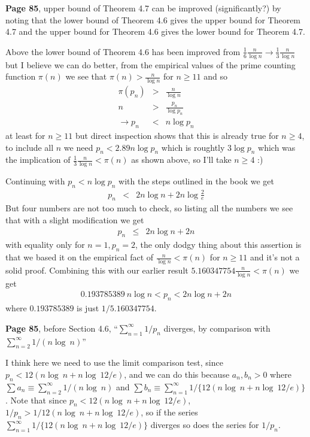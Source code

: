 \documentclass[aps,preprint,preprintnumbers,nofootinbib,showpacs,prd]{revtex4-1}
\newcommand{\nbea}{\begin{eqnarray*}}
\newcommand{\neea}{\end{eqnarray*}}
\begin{document}
{\bf Page 85}, upper bound of Theorem 4.7 can be improved (significantly?) by noting that the lower bound of Theorem 4.6 gives the upper bound for Theorem 4.7 and the upper bound for Theorem 4.6 gives the lower bound for Theorem 4.7.

Above the lower bound of Theorem 4.6 has been improved from $\frac{1}{6}\frac{n}{\log n} \to \frac{1}{3}\frac{n}{\log n}$ but I believe we can do better, from the empirical values of the prime counting function $\pi(n)$ we see that $\pi(n) > \frac{n}{\log n}$ for $n \ge 11$ and so
%
\nbea
\pi(p_n) & > & \frac{n}{\log n} \\
n & > & \frac{p_n}{\log p_n} \\
\to p_n & < & n \log p_n
\neea
%
at least for $n \ge 11$ but direct inspection shows that this is already true for $n \ge 4$, to include all $n$ we need $p_n < 2.89 n\log p_n$ which is roughtly $3\log p_n$ which was the implication of $\frac{1}{3}\frac{n}{\log n} < \pi(n)$ as shown above, so I'll take $n \ge 4$ :) 

Continuing with $p_n < n\log p_n$ with the steps outlined in the book we get
%
\nbea
p_n & < & 2n\log n + 2 n\log\frac{2}{e}
\neea
%
But four numbers are not too much to check, so listing all the numbers we see that with a slight modification we get
%
\nbea
p_n & \le & 2n\log n + 2n
\neea
%
with equality only for $n=1, p_n=2$, the only dodgy thing about this assertion is that we based it on the empirical fact of $\frac{n}{\log n}< \pi(n)$ for $n \ge 11$ and it's not a solid proof. Combining this with our earlier result $5.160347754 \frac{n}{\log n}<\pi(n)$ we get
%
\nbea
0.193785389 ~ n\log n < p_n < 2n\log n + 2n
\neea
%
where $0.193785389$ is just $1/5.160347754$.

{\bf Page 85}, before Section 4.6, ``$\sum_{n=1}^{\infty} 1/p_n$ diverges, by comparison with $\sum_{n=2}^{\infty}1/(n\log~n)$''

I think here we need to use the limit comparison test, since $p_n < 12(n\log~n + n\log~12/e)$, and we can do this because $a_n, b_n > 0$ where $\sum a_n \equiv \sum_{n=2}^{\infty} 1/(n \log~n)$ and $\sum b_n \equiv \sum_{n=1}^{\infty}1/\{12(n\log~n + n\log~12/e)\}$. Note that since $p_n < 12(n\log~n + n\log~12/e)$, $1/p_n > 1/12(n\log~n + n\log~12/e)$, so if the series $\sum_{n=1}^{\infty}1/\{12(n\log~n + n\log~12/e)\}$ diverges so does the series for $1/p_n$.
\end{document}
